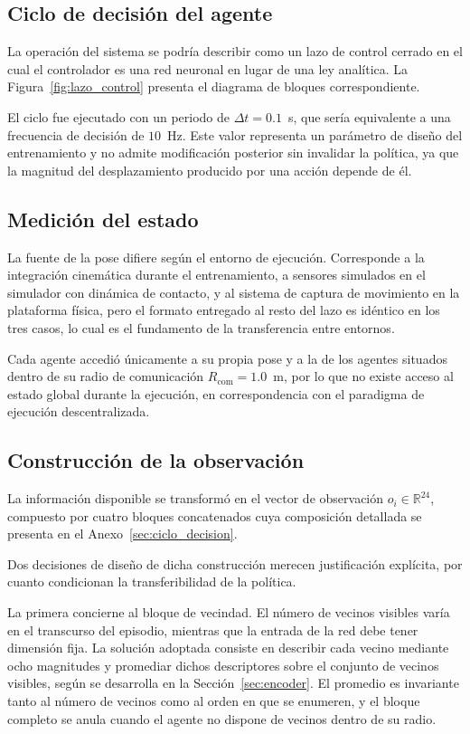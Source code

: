 \subsection*{Ciclo de decisión del agente}

La operación del sistema se podría describir como un lazo de control cerrado en el cual el controlador es una red neuronal en lugar de una ley analítica. La Figura~\ref{fig:lazo_control} presenta el diagrama de bloques correspondiente.

El ciclo fue ejecutado con un periodo de $\Delta t = 0{.}1$~s, que sería equivalente a una frecuencia de decisión de $10$~Hz. Este valor representa un parámetro de diseño del entrenamiento y no admite modificación posterior sin invalidar la política, ya que la magnitud del desplazamiento producido por una acción depende de él.

\subsection*{Medición del estado}

La fuente de la pose difiere según el entorno de ejecución. Corresponde a la integración cinemática durante el entrenamiento, a sensores simulados en el simulador con dinámica de contacto, y al sistema de captura de movimiento en la plataforma física, pero el formato entregado al resto del lazo es idéntico en los tres casos, lo cual es el fundamento de la transferencia entre entornos.

Cada agente accedió únicamente a su propia pose y a la de los agentes situados dentro de su radio de comunicación $R_{\text{com}} = 1{.}0$~m, por lo que no existe acceso al estado global durante la ejecución, en correspondencia con el paradigma de ejecución descentralizada.

\subsection*{Construcción de la observación}

La información disponible se transformó en el vector de observación $o_i \in \mathbb{R}^{24}$, compuesto por cuatro bloques concatenados cuya composición detallada se presenta en el Anexo~\ref{sec:ciclo_decision}.

Dos decisiones de diseño de dicha construcción merecen justificación explícita, por cuanto condicionan la transferibilidad de la política.

La primera concierne al bloque de vecindad. El número de vecinos visibles varía en el transcurso del episodio, mientras que la entrada de la red debe tener dimensión fija. La solución adoptada consiste en describir cada vecino mediante ocho magnitudes y promediar dichos descriptores sobre el conjunto de vecinos visibles, según se desarrolla en la Sección~\ref{sec:encoder}. El promedio es invariante tanto al número de vecinos como al orden en que se enumeren, y el bloque completo se anula cuando el agente no dispone de vecinos dentro de su radio.


